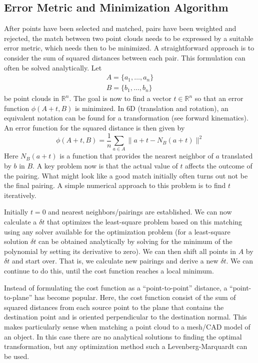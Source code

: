 \documentclass[paper=6.14in:9.21in,pagesize=pdftex,11pt,twoside,openright]{scrbook}
\begin{document}
\subsection{Error Metric and Minimization Algorithm}
After points have been selected and matched, pairs have been weighted and rejected, the match between two point clouds needs to be expressed by a suitable error metric, which needs then to be minimized. A straightforward approach is to consider the sum of squared distances between each pair. This formulation can often be solved analytically. Let
\begin{eqnarray}
A=\{a_1,\ldots,a_n\}\\
B=\{b_1,\dots,b_n\}
\end{eqnarray}
be point clouds in $ \mathbb{R}^n$. The goal is now to find a vector $ t \in \mathbb{R}^n$ so that an error function $ \phi(A+t,B)$ is minimized. In 6D (translation and rotation), an equivalent notation can be found for a transformation (see forward kinematics). An error function for the squared distance is then given by
\begin{equation}
\phi(A+t,B)=\frac{1}{n}\sum_{a \in A}\|a+t-N_B(a+t)\|^2
\end{equation}
Here $ N_B(a+t)$ is a function that provides the nearest neighbor of $ a$ translated by $ b$ in $ B$.  A key problem now is that the actual value of $t$ affects the outcome of the pairing. What might look like a good match initially often turns out not be the final pairing. A simple numerical approach to this problem is to find $ t$ iteratively.

Initially $t=0$ and nearest neighbors/pairings are established. We can now calculate a $ \delta t$ that optimizes the least-square problem based on this matching using any solver available for the optimization problem (for a least-square solution $ \delta t$ can be obtained analytically by solving for the minimum of the polynomial by setting its derivative to zero). We can then shift all points in $ A$ by $ \delta t$ and start over. That is, we calculate new pairings and derive a new $ \delta t$.  We can continue to do this, until the cost function reaches a local minimum.

Instead of formulating the cost function as a ``point-to-point'' distance, a ``point-to-plane'' has become popular. Here, the cost function consist of the sum of squared distances from each source point to the plane that contains the destination point and is oriented perpendicular to the destination normal. This makes particularly sense when matching a point cloud to a mesh/CAD model of an object. In this case there are no analytical solutions to finding the optimal transformation, but any optimization method such a Levenberg-Marquardt can be used.
\end{document}
